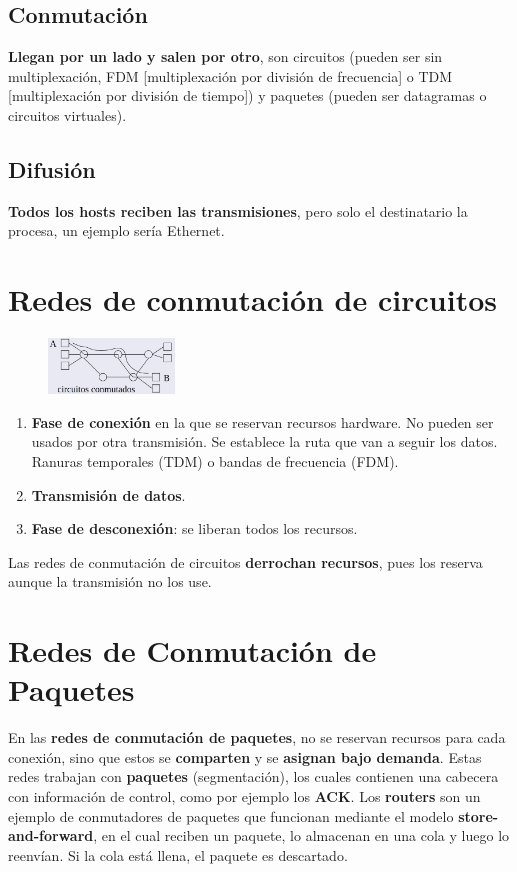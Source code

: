 \documentclass{article}
\begin{document}
\subsection{Conmutación}
\textbf{Llegan por un lado y salen por otro}, son circuitos (pueden ser sin multiplexación, FDM [multiplexación por división de frecuencia] o TDM [multiplexación por división de tiempo]) y paquetes (pueden ser datagramas o circuitos virtuales).

\subsection{Difusión}
\textbf{Todos los hosts reciben las transmisiones}, pero solo el destinatario la procesa, un ejemplo sería Ethernet.


\section{Redes de conmutación de circuitos}
\begin{figure}[h]
    \centering
    \includegraphics[width=0.3\textwidth]{img-t1/img_325_50.png}
\end{figure}

\begin{enumerate}
    \item \textbf{Fase de conexión} en la que se reservan recursos hardware. No pueden ser usados por otra transmisión. Se establece la ruta que van a seguir los datos. Ranuras temporales (TDM) o bandas de frecuencia (FDM).
    \item \textbf{Transmisión de datos}.
    \item \textbf{Fase de desconexión}: se liberan todos los recursos.
\end{enumerate}
Las redes de conmutación de circuitos \textbf{derrochan recursos}, pues los reserva aunque la transmisión no los use.

\newpage

\section{Redes de Conmutación de Paquetes}

En las \textbf{redes de conmutación de paquetes}, no se reservan recursos para cada conexión, sino que estos se \textbf{comparten} y se \textbf{asignan bajo demanda}. Estas redes trabajan con \textbf{paquetes} (segmentación), los cuales contienen una cabecera con información de control, como por ejemplo los \textbf{ACK}. Los \textbf{routers} son un ejemplo de conmutadores de paquetes que funcionan mediante el modelo \textbf{store-and-forward}, en el cual reciben un paquete, lo almacenan en una cola y luego lo reenvían. Si la cola está llena, el paquete es descartado.
\end{document}
